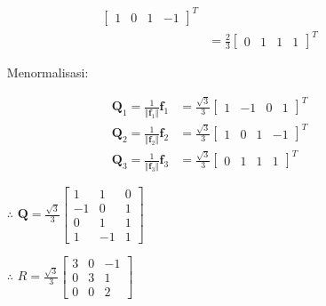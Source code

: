 \documentclass[12pt, a4paper]{scrartcl}
\begin{document}
\begin{enumerate}
\begin{enumerate}
\begin{align*}
\begin{bmatrix}
                        1&0&1&-1
                    \end{bmatrix}^T
                    \\ &= \frac{2}{3}\begin{bmatrix}
                        0&1&1&1
                    \end{bmatrix}^T
                \end{align*}
                \begin{itemize}
                    \item[] Menormalisasi:
                \end{itemize}
                \begin{align*}
                    \textbf{Q}_1=\frac{1}{\Vert\textbf{f}_1\Vert}\textbf{f}_1 &= \frac{\sqrt{3}}{3}\begin{bmatrix}
                        1&-1&0&1
                    \end{bmatrix}^T
                    \\ \textbf{Q}_2=\frac{1}{\Vert\textbf{f}_2\Vert}\textbf{f}_2 &= \frac{\sqrt{3}}{3}\begin{bmatrix}
                        1&0&1&-1
                    \end{bmatrix}^T
                    \\ \textbf{Q}_3=\frac{1}{\Vert\textbf{f}_3\Vert}\textbf{f}_3 &= \frac{\sqrt{3}}{3}\begin{bmatrix}
                        0&1&1&1
                    \end{bmatrix}^T
                \end{align*}
                \begin{itemize}
                    \item[$\therefore$] $\textbf{Q} = \frac{\sqrt{3}}{3}\begin{bmatrix}
                            1&1&0\\-1&0&1\\0&1&1\\1&-1&1
                        \end{bmatrix}$
                    \item[$\therefore$] $R=\frac{\sqrt{3}}{3}\begin{bmatrix}
                        3&0&-1\\0&3&1\\0&0&2
                    \end{bmatrix}$ 
                \end{itemize}
            \end{enumerate}
        \end{enumerate}
\end{document}
